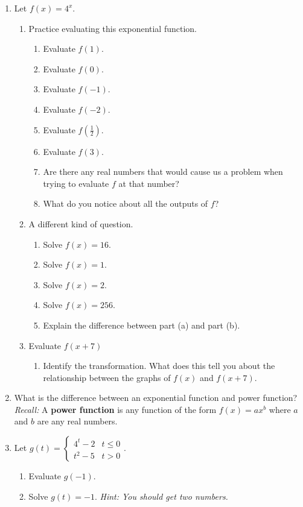 \documentclass{article}
\theoremstyle{plain}
\theoremstyle{box}
\begin{document}
\begin{enumerate}
\item Let $f(x) = 4^x$.
	\begin{enumerate}
	\item Practice evaluating this exponential function.
		\begin{enumerate}
		\item Evaluate $f(1)$. \vfill
		\item Evaluate $f(0)$. \vfill
		\item Evaluate $f(-1)$. \vfill
		\item Evaluate $f(-2)$. \vfill
		\item Evaluate $f \left( \frac{1}{2} \right)$. \vfill
		\item Evaluate $f(3)$. \vfill
		\item Are there any real numbers that would cause us a problem when trying to evaluate $f$ at that number? \vfill
		\item What do you notice about all the outputs of $f$? \vfill
		\end{enumerate}
	\item A different kind of question.
		\begin{enumerate}
		\item Solve $f(x) = 16$. \vfill
		\item Solve $f(x) = 1$. \vfill
		\item Solve $f(x) = 2$. \vfill
		\item Solve $f(x) = 256$. \vfill
		\item Explain the difference between part (a) and part (b).\vfill \vfill
		\end{enumerate}
	\item Evaluate $f(x+7)$
		\begin{enumerate}
		\item Identify the transformation. What does this tell you about the relationship between the graphs of $f(x)$ and $f(x+7)$. \vfill \vfill
		\end{enumerate}
	\end{enumerate}
\item What is the difference between an exponential function and power function?\\
\textit{Recall:} A \textbf{power function} is any function of the form $f(x) = ax^b$ where $a$ and $b$ are any real numbers. \vfill \vfill \vfill
\item Let $g(t) = \begin{cases} 
      4^t - 2 & t \leq 0 \\
      t^2 - 5 & t > 0
   \end{cases}.$
   	\begin{enumerate}
	\item Evaluate $g(-1)$. \vfill
	\item Solve $g(t) = -1$. \textit{Hint: You should get two numbers.}
	\end{enumerate}
\end{enumerate}
\end{document}

